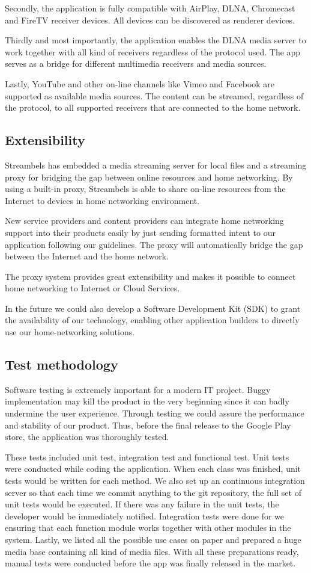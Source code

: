 Secondly, the application is fully compatible with AirPlay, DLNA, Chromecast and FireTV receiver devices. All devices can be discovered as renderer devices.

Thirdly and most importantly, the application enables the DLNA media server to
work together with all kind of receivers regardless of the protocol used. The
app serves as a bridge for different multimedia receivers and media sources.

Lastly, YouTube and other on-line channels like Vimeo and Facebook are
supported as available media sources. The content can be streamed, regardless
of the protocol, to all supported receivers that are connected to the home
network.

\subsection{Extensibility\label{3_5}}
Streambels has embedded a media streaming server for local files and a streaming proxy for bridging the gap between online resources and home networking. By using a built-in proxy, Streambels is able to share on-line resources from the Internet to devices in home networking environment.

New service providers and content providers can integrate home networking
support into their products easily by just sending formatted intent to our
application following our guidelines. The proxy will automatically bridge the
gap between the Internet and the home network.

The proxy system provides great extensibility and makes it possible to connect home networking to Internet or Cloud Services.

In the future we could also develop a Software Development Kit (SDK) to grant the availability of our technology, enabling other application builders to directly use our home-networking solutions.
\subsection{Test methodology\label{3_6}}
Software testing is extremely important for a modern IT project. Buggy
implementation may kill the product in the very beginning since it can badly
undermine the user experience. Through testing we could assure the performance
and stability of our product. Thus, before the final release to the Google Play
store, the application was thoroughly tested.

These tests included unit test, integration test and functional test.
Unit tests were conducted while coding the application. When each class was
finished, unit tests would be written for each method. We also set up an
continuous integration server so that each time we commit anything to the git
repository, the full set of unit tests would be executed. If there was any
failure in the unit tests, the developer would be immediately notified.
Integration tests were done for we ensuring that each function module works
together with other modules in the system. Lastly, we listed all the possible
use cases on paper and prepared a huge media base containing all kind of
media files. With all these preparations ready, manual tests were conducted
before the app was finally released in the market.

